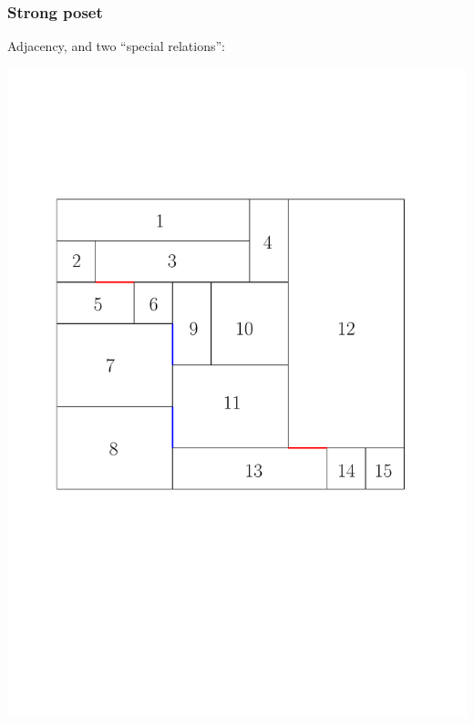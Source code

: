 \documentclass[11pt]{beamer}%
\begin{document}
\begin{frame}
  \frametitle{Strong poset}
  Adjacency, and two ``special relations'':
  \begin{center}
    \includegraphics[page=4, height=.2\textheight]{strong_poset.pdf}

\end{center}
\end{frame}
\end{document}
